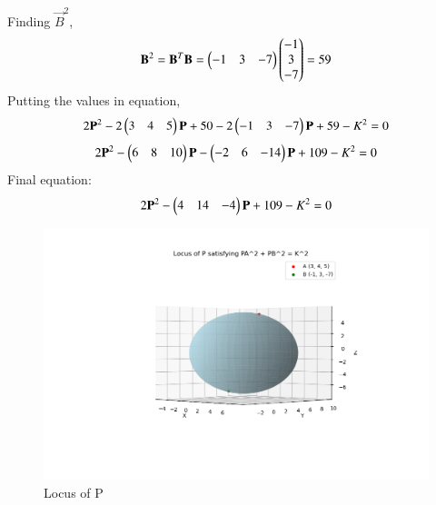 \documentclass[journal]{IEEEtran}
\numberwithin{equation}{enumi}
\numberwithin{figure}{enumi}
\begin{document}
Finding $\vec{B}^2$,
\begin{align}
\mathbf{B}^2=\mathbf{B}^T\mathbf{B}=\begin{pmatrix}-1&3&-7\end{pmatrix}\begin{pmatrix}-1\\3\\-7\end{pmatrix}=59
\end{align}
Putting the values in equation, 
\begin{align}
	2\mathbf{P}^2 -2\begin{pmatrix}3&4&5\end{pmatrix}\mathbf{P}+50-2\begin{pmatrix}-1&3&-7\end{pmatrix}\mathbf{P}+59-K^2=0
\end{align}
\begin{align}
	2\mathbf{P}^2 -\begin{pmatrix}6&8&10\end{pmatrix}\mathbf{P}-\begin{pmatrix}-2&6&-14\end{pmatrix}\mathbf{P}+109-K^2=0
\end{align}
Final equation:
\begin{align}
	2\mathbf{P}^2 -\begin{pmatrix}4&14&-4\end{pmatrix}\mathbf{P}+109-K^2=0
\end{align}

\begin{figure}[h!]
   \centering
   \includegraphics[width=1\linewidth]{Figure_1.png}
	\caption{Locus of P }
   \label{stemplot}
\end{figure}
\end{document}
